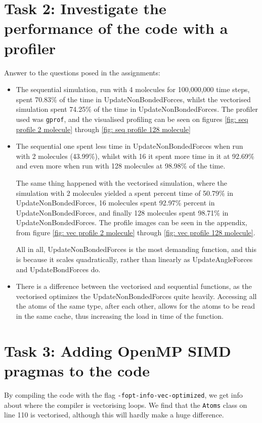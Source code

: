 \documentclass{article}
\begin{document}
\section{Task 2: Investigate the performance of the code with a profiler}
Answer to the questions posed in the assignments:
\begin{itemize}\setlength{\itemsep}{0pt}
    \item The sequential simulation, run with 4 molecules for 100,000,000 time steps, spent 70.83\% of the time in UpdateNonBondedForces, whilst the vectorised simulation spent 74.25\% of the time in UpdateNonBondedForces. The profiler used was \texttt{gprof}, and the visualised profiling can be seen on figures \ref{fig: seq profile 2 molecule} through \ref{fig: seq profile 128 molecule}
    \item The sequential one spent less time in UpdateNonBondedForces when run with 2 molecules (43.99\%), whilst with 16 it spent more time in it at 92.69\% and even more when run with 128 molecules at 98.98\% of the time.
    
    The same thing happened with the vectorised simulation, where the simulation with 2 molecules yielded a spent percent time of 50.79\%
    in UpdateNonBondedForces, 16 molecules spent 92.97\%
    percent in UpdateNonBondedForces, and finally 128 molecules spent 98.71\% 
    in UpdateNonBondedForces. The profile images can be seen in the appendix, from figure \ref{fig: vec profile 2 molecule} through \ref{fig: vec profile 128 molecule}.

    All in all, UpdateNonBondedForces is the most demanding function, and this is because it scales quadratically, rather than linearly as UpdateAngleForces and UpdateBondForces do.

    \item There is a difference between the vectorised and sequential functions, as the vectorised optimizes the UpdateNonBondedForces quite heavily. Accessing all the atoms of the same type, after each other, allows for the atoms to be read in the same cache, thus increasing the load in time of the function.
\end{itemize}


\section{Task 3: Adding OpenMP SIMD pragmas to the code}
By compiling the code with the flag \texttt{-fopt-info-vec-optimized}, we get info about where the compiler is vectorising loops. We find that the \texttt{Atoms} class on line 110 is vectorised, although this will hardly make a huge difference. 
\end{document}
